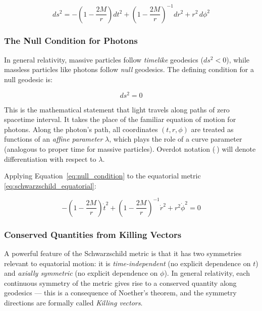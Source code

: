 \documentclass[12pt,a4paper]{article}
\begin{document}
\begin{equation}
    ds^2 = -\left(1 - \frac{2M}{r}\right)dt^2
    + \left(1 - \frac{2M}{r}\right)^{-1}dr^2
    + r^2\,d\phi^2
    \label{eq:schwarzschild_equatorial}
\end{equation}

\subsubsection{The Null Condition for Photons}
In general relativity, massive particles follow \textit{timelike} geodesics ($ds^2 < 0$), while massless particles like photons follow \textit{null} geodesics. The defining condition for a null geodesic is:

\begin{equation}
    ds^2 = 0
    \label{eq:null_condition}
\end{equation}

This is the mathematical statement that light travels along paths of zero spacetime interval. It takes the place of the familiar equation of motion for photons. Along the photon's path, all coordinates $(t, r, \phi)$ are treated as functions of an \textit{affine parameter} $\lambda$, which plays the role of a curve parameter (analogous to proper time for massive particles). Overdot notation ($\dot{~}$) will denote differentiation with respect to $\lambda$.

Applying Equation~\eqref{eq:null_condition} to the equatorial metric \eqref{eq:schwarzschild_equatorial}:

\begin{equation}
    -\left(1 - \frac{2M}{r}\right)\dot{t}^2
    + \left(1 - \frac{2M}{r}\right)^{-1}\dot{r}^2
    + r^2\dot{\phi}^2 = 0
    \label{eq:null_expanded}
\end{equation}

\subsubsection{Conserved Quantities from Killing Vectors}
A powerful feature of the Schwarzschild metric is that it has two symmetries relevant to equatorial motion: it is \textit{time-independent} (no explicit dependence on $t$) and \textit{axially symmetric} (no explicit dependence on $\phi$). In general relativity, each continuous symmetry of the metric gives rise to a conserved quantity along geodesics — this is a consequence of Noether's theorem, and the symmetry directions are formally called
\textit{Killing vectors}.
\end{document}

